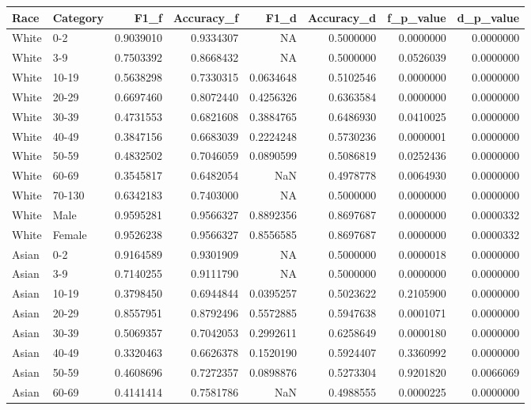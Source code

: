 \documentclass[
  letterpaper,
  DIV=11,
  numbers=noendperiod]{scrreprt}
\begin{document}
\begin{tabular}{l|l|r|r|r|r|r|r}
\hline
Race & Category & F1\_f & Accuracy\_f & F1\_d & Accuracy\_d & f\_p\_value & d\_p\_value\\
\hline
White & 0-2 & 0.9039010 & 0.9334307 & NA & 0.5000000 & 0.0000000 & 0.0000000\\
\hline
White & 3-9 & 0.7503392 & 0.8668432 & NA & 0.5000000 & 0.0526039 & 0.0000000\\
\hline
White & 10-19 & 0.5638298 & 0.7330315 & 0.0634648 & 0.5102546 & 0.0000000 & 0.0000000\\
\hline
White & 20-29 & 0.6697460 & 0.8072440 & 0.4256326 & 0.6363584 & 0.0000000 & 0.0000000\\
\hline
White & 30-39 & 0.4731553 & 0.6821608 & 0.3884765 & 0.6486930 & 0.0410025 & 0.0000000\\
\hline
White & 40-49 & 0.3847156 & 0.6683039 & 0.2224248 & 0.5730236 & 0.0000001 & 0.0000000\\
\hline
White & 50-59 & 0.4832502 & 0.7046059 & 0.0890599 & 0.5086819 & 0.0252436 & 0.0000000\\
\hline
White & 60-69 & 0.3545817 & 0.6482054 & NaN & 0.4978778 & 0.0064930 & 0.0000000\\
\hline
White & 70-130 & 0.6342183 & 0.7403000 & NA & 0.5000000 & 0.0000000 & 0.0000000\\
\hline
White & Male & 0.9595281 & 0.9566327 & 0.8892356 & 0.8697687 & 0.0000000 & 0.0000332\\
\hline
White & Female & 0.9526238 & 0.9566327 & 0.8556585 & 0.8697687 & 0.0000000 & 0.0000332\\
\hline
Asian & 0-2 & 0.9164589 & 0.9301909 & NA & 0.5000000 & 0.0000018 & 0.0000000\\
\hline
Asian & 3-9 & 0.7140255 & 0.9111790 & NA & 0.5000000 & 0.0000000 & 0.0000000\\
\hline
Asian & 10-19 & 0.3798450 & 0.6944844 & 0.0395257 & 0.5023622 & 0.2105900 & 0.0000000\\
\hline
Asian & 20-29 & 0.8557951 & 0.8792496 & 0.5572885 & 0.5947638 & 0.0001071 & 0.0000000\\
\hline
Asian & 30-39 & 0.5069357 & 0.7042053 & 0.2992611 & 0.6258649 & 0.0000180 & 0.0000000\\
\hline
Asian & 40-49 & 0.3320463 & 0.6626378 & 0.1520190 & 0.5924407 & 0.3360992 & 0.0000000\\
\hline
Asian & 50-59 & 0.4608696 & 0.7272357 & 0.0898876 & 0.5273304 & 0.9201820 & 0.0066069\\
\hline
Asian & 60-69 & 0.4141414 & 0.7581786 & NaN & 0.4988555 & 0.0000225 & 0.0000000\\

\end{tabular}
\end{document}
